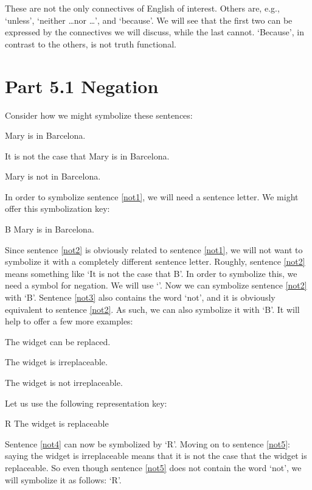 These are not the only connectives of English of interest. Others are, e.g., ‘unless’, ‘neither \ldots nor \ldots ’, and ‘because’. We will see that the first two can be expressed by the connectives we will discuss, while the last cannot. ‘Because’, in contrast to the others, is not truth functional.

\section{Part 5.1 Negation }
\label{s:Part 5.1 Negation}
Consider how we might symbolize these sentences:
\begin{earg}
	\item[\ex{not1}] Mary is in Barcelona.
	\item[\ex{not2}] It is not the case that Mary is in Barcelona.
	\item[\ex{not3}] Mary is not in Barcelona.
	\end{earg}
In order to symbolize sentence \ref{not1}, we will need a sentence letter. We might offer this symbolization key:
	\begin{ekey}
		\item[B] Mary is in Barcelona.
	\end{ekey}
Since sentence \ref{not2} is obviously related to sentence \ref{not1}, we will not want to symbolize it with a completely different sentence letter. Roughly, sentence \ref{not2} means something like ‘It is not the case that B’. In order to symbolize this, we need a symbol for \gls{negation}. We will use ‘\enot ’. Now we can symbolize sentence \ref{not2} with ‘\enot B’.
Sentence \ref{not3} also contains the word ‘not’, and it is obviously equivalent to sentence \ref{not2}. As such, we can also symbolize it with ‘\enot B’.
It will help to offer a few more examples:
	\begin{earg}
		\item[\ex{not4}] The widget can be replaced.
		\item[\ex{not5}] The widget is irreplaceable.
		\item[\ex{not5b}] The widget is not irreplaceable.
	\end{earg}
Let us use the following representation key:
	\begin{ekey}
		\item[R] The widget is replaceable
	\end{ekey}
Sentence \ref{not4} can now be symbolized by ‘R’. Moving on to sentence \ref{not5}: saying the widget is irreplaceable means that it is not the case that the widget is replaceable. So even though sentence \ref{not5} does not contain the word ‘not’, we will symbolize it as follows: ‘\enot R’.
